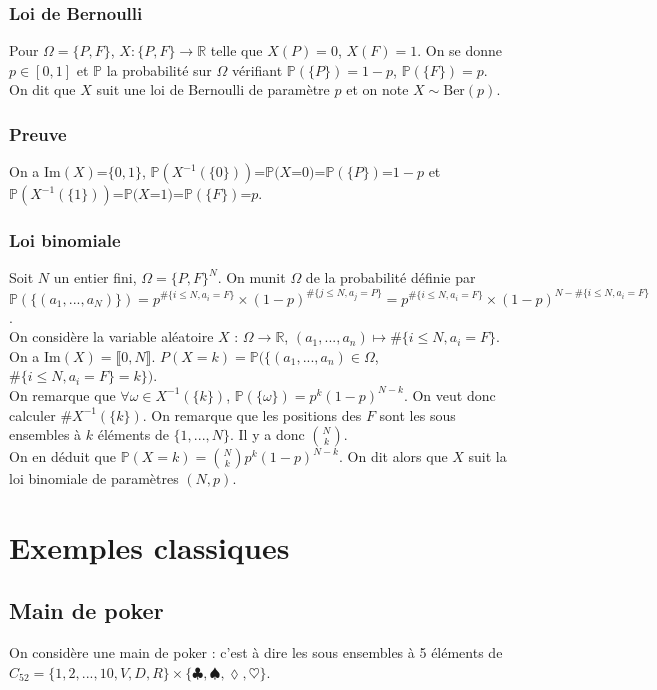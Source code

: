 \documentclass[a4paper,10pt]{book} %
\newcommand{\R}{\mathbb{R}}
\renewcommand{\P}{\mathbb{P}} %
\newcommand{\Ima}{\mathrm{Im}} %
\newcommand{\Ber}{\mathrm{Ber}} %
\begin{document}
\subsubsection{Loi de Bernoulli}
Pour $\Omega=\{P,F\}$, $X :\{P,F\}\rightarrow \R$ telle que $X(P)=0$, $X(F)=1$. On se donne $p\in [0,1]$ et $\P$ la probabilité sur $\Omega$ vérifiant $\P(\{P\})=1-p$, $\P(\{F\})=p$.\\

On dit que $X$ suit une loi de Bernoulli de paramètre $p$ et on note $X\sim \Ber(p)$.

\subsubsection{Preuve}
On a $\Ima(X)$=$\{0,1\}$, $\P(X^{-1}(\{0\}))$=$\P(X$=$0)$=$\P(\{P\})$=$1-p$ et $\P(X^{-1}(\{1\}))$=$\P(X$=$1)$=$\P(\{F\})$=$p$.

\subsubsection{Loi binomiale}
Soit $N$ un entier fini, $\Omega=\{P,F\}^N$. On munit $\Omega$ de la probabilité définie par\\
$\displaystyle \P(\{(a_1,...,a_N)\})=p^{\#\{i\leq N, a_i=F\}}\times (1-p)^{\#\{j\leq N, a_j=P\}}=p^{\#\{i\leq N, a_i=F\}}\times (1-p)^{N-\#\{i\leq N, a_i=F\}}$.\\

On considère la variable aléatoire $X$ : $\Omega\rightarrow \R$, $(a_1,...,a_n)\mapsto \#\{i\leq N, a_i=F\}$.\\

On a $\Ima(X)=\llbracket 0,N\rrbracket$. $P(X=k)=\P(\{(a_1,...,a_n)\in \Omega$, $\#\{i\leq N, a_i=F\}=k\})$.\\

On remarque que $\forall \omega \in X^{-1}(\{k\})$, $\P(\{\omega\})=p^k(1-p)^{N-k}$. On veut donc calculer $\#X^{-1}(\{k\})$. On remarque que les positions des $F$ sont les sous ensembles à $k$ éléments de $\{1,...,N\}$. Il y a donc $\binom{N}{k}$.\\

On en déduit que $\P(X=k)=\binom{N}{k}p^k(1-p)^{N-k}$. On dit alors que $X$ suit la loi binomiale de paramètres $(N,p)$.

\section{Exemples classiques}
\subsection{Main de poker}
On considère une main de poker : c'est à dire les sous ensembles à 5 éléments de $C_{52}=\{1,2,...,10,V,D,R\}\times \{\clubsuit,\spadesuit,\lozenge,\heartsuit\}$.\\
\end{document}
